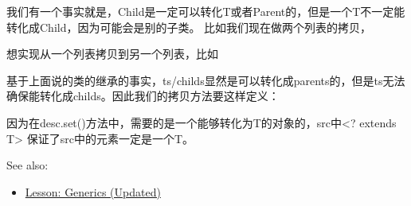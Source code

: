 \documentclass[12pt]{article}
\begin{document}
我们有一个事实就是，Child是一定可以转化T或者Parent的，但是一个T不一定能转化成Child，因为可能会是别的子类。 比如我们现在做两个列表的拷贝，

\begin{Shaded}
\begin{Highlighting}[]
  \OperatorTok{\textless{}}\OperatorTok{\textgreater{}}  \OperatorTok{(}\OperatorTok{,} \OperatorTok{)}
\end{Highlighting}
\end{Shaded}

想实现从一个列表拷贝到另一个列表，比如

\begin{Shaded}
\begin{Highlighting}[]
\OperatorTok{\textless{}}\OperatorTok{\textgreater{}}\OperatorTok{;}
\OperatorTok{\textless{}}\OperatorTok{\textgreater{}}\OperatorTok{;}
\OperatorTok{\textless{}}\OperatorTok{\textgreater{}}\OperatorTok{;}
\end{Highlighting}
\end{Shaded}

基于上面说的类的继承的事实，ts/childs显然是可以转化成parents的，但是ts无法确保能转化成childs。因此我们的拷贝方法要这样定义：

\begin{Shaded}
\begin{Highlighting}[]
   \OperatorTok{\{} 
    \OperatorTok{\textless{}}\OperatorTok{\textgreater{}} 
  \OperatorTok{(}  \OperatorTok{\textgreater{}}\OperatorTok{,}  \OperatorTok{\textgreater{}}\OperatorTok{)} \OperatorTok{\{}  
       \OperatorTok{(}\OperatorTok{=}\OperatorTok{;}\OperatorTok{\textless{}}\OperatorTok{();}\OperatorTok{++)} 
\OperatorTok{(}\OperatorTok{,}\OperatorTok{(}\OperatorTok{));} 
  \OperatorTok{\}} 
\OperatorTok{\}}
\end{Highlighting}
\end{Shaded}

因为在desc.set()方法中，需要的是一个能够转化为T的对象的，src中\textless? extends T\textgreater{} 保证了src中的元素一定是一个T。

See also:

\begin{itemize}
\tightlist
\item
  \href{https://docs.oracle.com/javase/tutorial/java/generics/index.html}{Lesson: Generics (Updated)}
\end{itemize}
\end{document}
